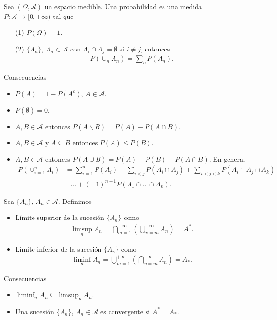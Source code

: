 \begin{defi}
Sea $(\Omega, \mathcal{A})$ un espacio medible. Una probabilidad es una medida $P: \mathcal{A} \longrightarrow [0,+\infty)$ tal que
\begin{enumerate}
    \item[(1)] $P(\Omega) = 1$.
    \item[(2)] $\{A_n\}$, $A_n \in \mathcal{A}$ con $A_i \cap A_j = \emptyset$ si $i \not = j$, entonces
    \begin{align*}
        P(\cup_{n}{A_n}) = \sum_{n}{P(A_n)}.
    \end{align*}
\end{enumerate}
Consecuencias 
\begin{itemize}
    \item $P(A) = 1 - P(A^c)$, $A \in \mathcal{A}$.
    \item $P(\emptyset) = 0$.
    \item $A, B \in \mathcal{A}$ entonces $P(A \backslash B) = P(A) - P(A \cap B)$.
    \item $A, B \in \mathcal{A}$ y $A \subseteq B$ entonces $P(A) \leq P(B)$.
    \item $A, B \in \mathcal{A}$ entonces $P(A \cup B) = P(A) + P(B) - P(A \cap B)$. En general
    \begin{align*}
        P(\cup_{i=1}^{n}{A_i}) &= \sum_{i=1}^{n}{P(A_i)} - \sum_{i < j}{P(A_i \cap A_j)} + \sum_{i< j < k}{P(A_i \cap A_j \cap A_k)}\\
        & - ... + (-1)^{n-1}P(A_1 \cap ... \cap A_n).
    \end{align*}
\end{itemize}
\end{defi}

\begin{defi}
Sea $\{A_n\}$, $A_n \in \mathcal{A}$. Definimos
\begin{itemize}
    \item Límite superior de la sucesión $\{A_n\}$ como
    \begin{align*}
        \limsup_{n}{A_n} = \bigcap_{m=1}^{+\infty}{\left(\bigcup_{n=m}^{+\infty}{A_n}\right)} = A^*.
    \end{align*}
    \item Límite inferior de la sucesión $\{A_n\}$ como
    \begin{align*}
        \liminf_{n}{A_n} = \bigcup_{m=1}^{+\infty}{\left(\bigcap_{n=m}^{+\infty}{A_n}\right)} = A_*.
    \end{align*}
\end{itemize}
Consecuencias
\begin{itemize}
    \item $\liminf_{n}{A_n} \subseteq \limsup_{n}{A_n}$.
    \item Una sucesión $\{A_n\}$, $A_n \in \mathcal{A}$ es convergente si $A^* = A_*$.
\end{itemize}
\end{defi}

